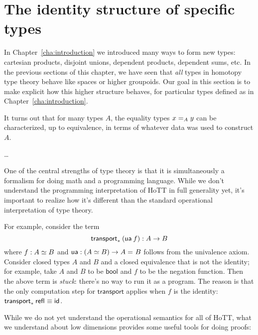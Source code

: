 \section{The identity structure of specific types}

In Chapter~\ref{cha:introduction} we introduced many ways to form new types: cartesian products, disjoint unions, dependent products, dependent sums, etc.
In the previous sections of this chapter, we have seen that \emph{all} types in homotopy type theory behave like spaces or higher groupoids.
Our goal in this section is to make explicit how this higher structure behaves, for particular types defined as in Chapter~\ref{cha:introduction}.

It turns out that for many types $A$, the equality types $\id[A]xy$ can be characterized, up to equivalence, in terms of whatever data was used to construct $A$.

\dots

One of the central strengths of type theory is that it is simultaneously
a formalism for doing math and a programming language.  While we don't
understand the programming interpretation of HoTT in full generality
yet, it's important to realize how it's different than the standard
operational interpretation of type theory.

\newcommand\ua[1]{\ensuremath{\mathsf{ua}} \: #1}

For example, consider the term 
\[
\transport{X \mapsto X}{(\ua{f})} : A \to B
\]
where $f : \eqv{A}{B}$ and 
$\mathsf{ua} : (\eqv A B) \to \id A B$ follows from the univalence axiom.  
Consider closed types $A$ and $B$ and a closed equivalence that is
not the identity; for example, take $A$ and $B$ to be $\mathsf{bool}$ and
$f$ to be the negation function.  Then the above term is \emph{stuck}:
there's no way to run it as a program.  The reason is that the only
computation step for $\mathsf{transport}$ applies when $f$ is the
identity: $\transport{X \mapsto A(X)}{\refl{}} \jdeq \idfunc$.  

While we do not yet understand the operational semantics for all of
HoTT, what we understand about low dimensions provides some useful tools
for doing proofs:

